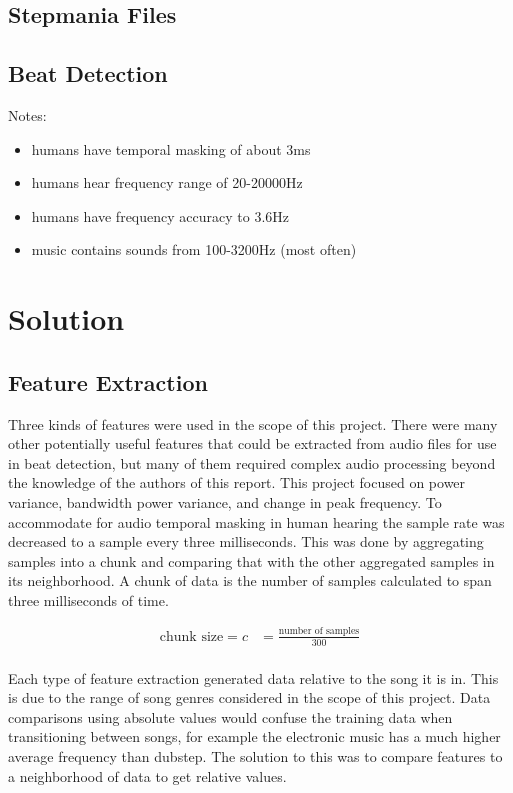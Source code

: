 \documentclass[12pt]{article}
\begin{document}
\subsection{Stepmania Files}



\subsection{Beat Detection}
Notes:
	\begin{itemize}
		\item humans have temporal masking of about 3ms
		\item humans hear frequency range of 20-20000Hz
		\item humans have frequency accuracy to 3.6Hz
		\item music contains sounds from 100-3200Hz (most often)
	\end{itemize}


\section{Solution}

\subsection{Feature Extraction}
Three kinds of features were used in the scope of this project. There were many other potentially useful features that could be extracted from audio files for use in beat detection, but many of them required complex audio processing beyond the knowledge of the authors of this report. This project focused on power variance, bandwidth power variance, and change in peak frequency. To accommodate for audio temporal masking in human hearing the sample rate was decreased to a sample every three milliseconds. This was done by aggregating samples into a chunk and comparing that with the other aggregated samples in its neighborhood. A chunk of data is the number of samples calculated to span three milliseconds of time.

\begin{align*}
	\text{chunk size} = c &= \frac{\text{number of samples}}{300}\\
\end{align*}

Each type of feature extraction generated data relative to the song it is in. This is due to the range of song genres considered in the scope of this project. Data comparisons using absolute values would confuse the training data when transitioning between songs, for example the electronic music has a much higher average frequency than dubstep. The solution to this was to compare features to a neighborhood of data to get relative values.
\end{document}
